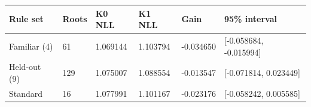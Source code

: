 \begin{tabular}{llllll}
\hline
Rule set & Roots & K0 NLL & K1 NLL & Gain & 95\% interval \\
\hline
Familiar (4) & 61 & 1.069144 & 1.103794 & -0.034650 & [-0.058684, -0.015994] \\
Held-out (9) & 129 & 1.075007 & 1.088554 & -0.013547 & [-0.071814, 0.023449] \\
Standard & 16 & 1.077991 & 1.101167 & -0.023176 & [-0.058242, 0.005585] \\
\hline
\end{tabular}
